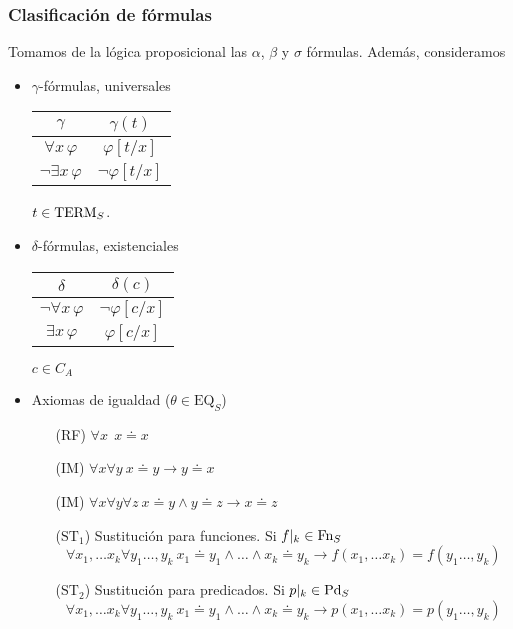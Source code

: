 \subsubsection{Clasificación de fórmulas}
Tomamos de la lógica proposicional las $\alpha$, $\beta$ y $\sigma$ fórmulas. Además, consideramos
\begin{itemize}
	\item $\gamma$-fórmulas, universales 
	\begin{table}[h!]
\centering
\begin{tabular}{c|c}
$\gamma$                   & $\gamma (t)$         \\ \hline
$\forall x \, \varphi$     & $\varphi [t/x]$      \\
$\neg \exists x \, \varphi$ & $\neg \varphi [t/x]$
\end{tabular}
$t \in \mbox{TERM}_{S}$.
\end{table}
\newpage
	\item $\delta$-fórmulas, existenciales
\begin{table}[h!]
\centering
\begin{tabular}{c|c}
$\delta$                   & $\delta (c)$         \\ \hline
$\neg \forall x \, \varphi$     & $\neg \varphi [c/x]$      \\
$\exists x \, \varphi$ & $\varphi [c/x]$
\end{tabular}
$c \in C_A$
\end{table}
	\item Axiomas de igualdad ($\theta \in \mbox{EQ}_S$) 
	\begin{itemize}
		\item[(RF)] $\forall x \:\: x \doteq x$
		\item[(IM)] $\forall x \forall y \: x \doteq y \rightarrow y \doteq x $
		\item[(IM)] $\forall x \forall y \forall z \: x \doteq y \wedge y \doteq z \rightarrow x \doteq z $
		\item[($\mbox{ST}_1$)] Sustitución para funciones. Si $f\vert_{k} \in \mbox{Fn}_{S}$ 
		\[ \forall x_1, \ldots x_k \forall y_1 \ldots, y_k \: x_1 \doteq y_1 \wedge \ldots \wedge x_k \doteq y_k  \rightarrow f(x_1, \ldots x_k) = f( y_1 \ldots, y_k)\]
		\item[($\mbox{ST}_2$)] Sustitución para predicados. Si $p\vert_{k} \in \mbox{Pd}_{S}$ 
		\[ \forall x_1, \ldots x_k \forall y_1 \ldots, y_k \: x_1 \doteq y_1 \wedge \ldots \wedge x_k \doteq y_k  \rightarrow p(x_1, \ldots x_k) = p( y_1 \ldots, y_k)\]
	\end{itemize}
\end{itemize}
